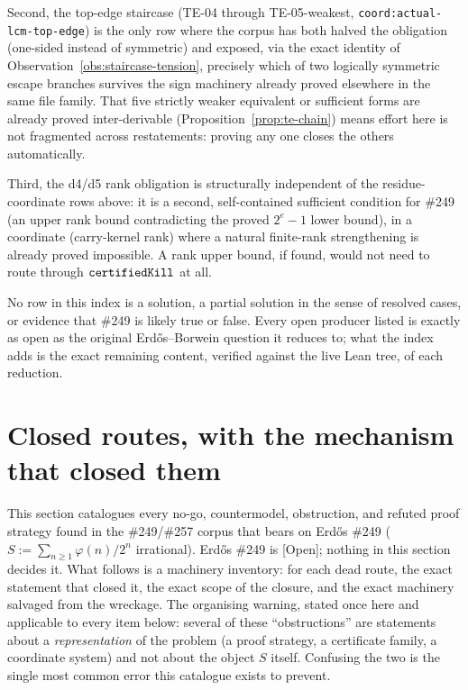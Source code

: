 \documentclass[11pt]{article}
\theoremstyle{plain}
\theoremstyle{definition}
\theoremstyle{remark}
\let\origmathtt\mathtt
\renewcommand{\mathtt}[1]{\ifmmode\origmathtt{#1}\else\texttt{#1}\fi}%
\newcommand{\ev}[1]{{\small\textsf{[#1]}}\xspace}
\newcommand{\coord}[1]{\texorpdfstring{{\small\nolinkurl{coord:#1}}}{coord:#1}\xspace}
\begin{document}
Second, the top-edge staircase (TE-04 through TE-05-weakest, \coord{actual-lcm-top-edge}) is the
only row where the corpus has both halved the obligation (one-sided instead of symmetric) and
exposed, via the exact identity of Observation~\ref{obs:staircase-tension}, precisely which of two
logically symmetric escape branches survives the sign machinery already proved elsewhere in the
same file family. That five strictly weaker equivalent or sufficient forms are already proved
inter-derivable (Proposition~\ref{prop:te-chain}) means effort here is not fragmented across
restatements: proving any one closes the others automatically.

Third, the d4/d5 rank obligation is structurally independent of the residue-coordinate rows above:
it is a second, self-contained sufficient condition for \#249 (an upper rank bound contradicting
the proved $2^e{-}1$ lower bound), in a coordinate (carry-kernel rank) where a natural finite-rank
strengthening is already proved impossible. A rank upper bound, if found, would not need to route
through $\mathtt{certifiedKill}$ at all.

No row in this index is a solution, a partial solution in the sense of resolved cases, or evidence
that \#249 is likely true or false. Every open producer listed is exactly as open as the original
Erd\H{o}s--Borwein question it reduces to; what the index adds is the exact remaining content,
verified against the live Lean tree, of each reduction.
\section{Closed routes, with the mechanism that closed them}

This section catalogues every no-go, countermodel, obstruction, and refuted
proof strategy found in the \#249/\#257 corpus that bears on Erd\H{o}s \#249
(\(S := \sum_{n\ge1}\varphi(n)/2^n\) irrational). Erd\H{o}s \#249 is
\ev{Open}; nothing in this section decides it. What follows is a machinery
inventory: for each dead route, the exact statement that closed it, the exact
scope of the closure, and the exact machinery salvaged from the wreckage.
The organising warning, stated once here and applicable to every item below:
several of these ``obstructions'' are statements about a
\emph{representation} of the problem (a proof strategy, a certificate
family, a coordinate system) and not about the object \(S\) itself. Confusing
the two is the single most common error this catalogue exists to prevent.
\end{document}
